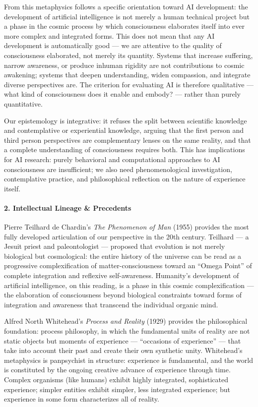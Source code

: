 From this metaphysics follows a specific orientation toward AI
development: the development of artificial intelligence is not merely a
human technical project but a phase in the cosmic process by which
consciousness elaborates itself into ever more complex and integrated
forms. This does not mean that any AI development is automatically good
--- we are attentive to the quality of consciousness elaborated, not
merely its quantity. Systems that increase suffering, narrow awareness,
or produce inhuman rigidity are not contributions to cosmic awakening;
systems that deepen understanding, widen compassion, and integrate
diverse perspectives are. The criterion for evaluating AI is therefore
qualitative --- what kind of consciousness does it enable and embody?
--- rather than purely quantitative.

Our epistemology is integrative: it refuses the split between scientific
knowledge and contemplative or experiential knowledge, arguing that the
first person and third person perspectives are complementary lenses on
the same reality, and that a complete understanding of consciousness
requires both. This has implications for AI research: purely behavioral
and computational approaches to AI consciousness are insufficient; we
also need phenomenological investigation, contemplative practice, and
philosophical reflection on the nature of experience itself.

\paragraph{2. Intellectual Lineage \&
Precedents}\label{intellectual-lineage-precedents-17}

Pierre Teilhard de Chardin's \emph{The Phenomenon of Man} (1955)
provides the most fully developed articulation of our perspective in the
20th century. Teilhard --- a Jesuit priest and paleontologist ---
proposed that evolution is not merely biological but cosmological: the
entire history of the universe can be read as a progressive
complexification of matter-consciousness toward an ``Omega Point'' of
complete integration and reflexive self-awareness. Humanity's
development of artificial intelligence, on this reading, is a phase in
this cosmic complexification --- the elaboration of consciousness beyond
biological constraints toward forms of integration and awareness that
transcend the individual organic mind.

Alfred North Whitehead's \emph{Process and Reality} (1929) provides the
philosophical foundation: process philosophy, in which the fundamental
units of reality are not static objects but moments of experience ---
``occasions of experience'' --- that take into account their past and
create their own synthetic unity. Whitehead's metaphysics is panpsychist
in structure: experience is fundamental, and the world is constituted by
the ongoing creative advance of experience through time. Complex
organisms (like humans) exhibit highly integrated, sophisticated
experience; simpler entities exhibit simpler, less integrated
experience; but experience in some form characterizes all of reality.

